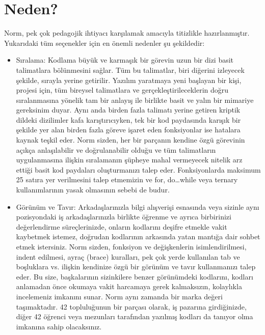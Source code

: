 \documentclass{42-en}
\begin{document}
   \newpage
    \section{Neden?}

    Norm, pek çok pedagojik ihtiyacı karşılamak amacıyla titizlikle hazırlanmıştır. Yukarıdaki tüm seçenekler için
en önemli nedenler şu şekildedir:

    \begin{itemize}

    \item Sıralama: Kodlama büyük ve karmaşık bir görevin uzun bir dizi basit
        talimatlara bölünmesini sağlar. Tüm bu talimatlar, biri diğerini izleyecek
        şekilde, sırayla yerine getirilir. Yazılım yaratmaya yeni başlayan bir kişi,
        projesi için, tüm bireysel talimatlara ve gerçekleştirileceklerin doğru
        sıralanmasına yönelik tam bir anlayış ile birlikte basit ve yalın bir mimariye
        gereksinim duyar. Aynı anda birden fazla talimatı yerine getiren kriptik dildeki
        dizilimler kafa karıştırıcıyken, tek bir kod paydasında karışık bir şekilde yer
        alan birden fazla göreve işaret eden fonksiyonlar ise hatalara kaynak teşkil eder.
        Norm sizden, her bir parçanın kendine özgü görevinin açıkça anlaşılabilir ve
        doğrulanabilir olduğu ve tüm talimatların uygulanmasına ilişkin sıralamanın
        şüpheye mahal vermeyecek nitelik arz ettiği basit kod paydaları oluşturmanızı
        talep eder. Fonksiyonlarda maksimum 25 satıra yer verilmesini talep etmemizin ve for,
        do…while veya ternary kullanımlarının yasak olmasının sebebi de budur.

    \item Görünüm ve Tavır: Arkadaşlarınızla bilgi alışverişi esnasında veya sizinle
        aynı pozisyondaki iş arkadaşlarınızla birlikte öğrenme ve ayrıca birbirinizi
        değerlendirme süreçlerinizde, onların kodlarını deşifre etmekle vakit kaybetmek
        istemez, doğrudan kodlarının arkasında yatan mantığa dair sohbet etmek istersiniz.
        Norm sizden, fonksiyon ve değişkenlerin isimlendirilmesi, indent edilmesi, ayraç
        (brace) kuralları, pek çok yerde kullanılan tab ve boşluklara vs. ilişkin kendinize
        özgü bir görünüm ve tavır kullanmanızı talep eder. Bu size, başkalarının sizinkilere
        benzer görünümdeki kodlarını, kodları anlamadan önce okumaya vakit harcamaya gerek
        kalmaksızın, kolaylıkla incelemeniz imkanını sunar. Norm aynı zamanda bir marka değeri
        taşımaktadır. 42 topluluğunun bir parçası olarak, iş pazarına girdiğinizde, diğer 42
        öğrenci veya mezunları tarafından yazılmış kodları da tanıyor olma imkanına sahip
        olacaksınız.


\end{itemize}
\end{document}
